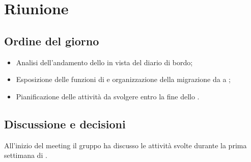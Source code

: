 \section{Riunione}
\subsection{Ordine del giorno}
\begin{itemize}
	\item Analisi dell'andamento dello  in vista del diario di bordo;
	\item Esposizione delle funzioni di  e organizzazione della migrazione da  a ;
	\item Pianificazione delle attività da svolgere entro la fine dello .
\end{itemize}

\subsection{Discussione e decisioni}
\par All'inizio del meeting il gruppo ha discusso le attività svolte durante la prima settimana di .
